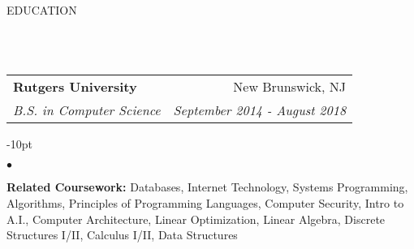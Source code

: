 \documentclass[12pt]{article}
\makeatletter
\newcommand{\header}[1]{
	\vspace*{12pt} %
	{\hspace*{-14pt}\vspace*{6pt} #1}
	\vspace*{-6pt} 
	\lineunder
}
\newcommand{\lineunder}{
	\vspace*{-8pt} \\ 
	\hspace*{-18pt} 
	\hrulefill \\
}
\newcommand{\subheading}[4]{
 	\vspace{5pt}
    	\begin{tabular*}{1.01\textwidth}
    		{l@{\extracolsep{\fill}}r}
      		\hspace{-16pt}\textbf{#1} & #2 \\
      		\hspace{-16pt}\textit{\small#3} & \textit{\small #4} \\
    	\end{tabular*}
    \vspace{-4pt}
}
\newenvironment{achievements}{
\begin{adjustwidth}{-10pt}{}
  \begin{list}{$\bullet$}{
  	\topsep 0pt \itemsep -4pt}}
  	{\vspace*{2pt}\end{list}
\end{adjustwidth}
}
\makeatother
\begin{document}
\vspace{-8pt}
\header{EDUCATION}

\subheading
	{Rutgers University}{New Brunswick, NJ}
	{B.S. in Computer Science}{September 2014 - August 2018}
	\begin{achievements}	
	\item{\bf Related Coursework:} Databases, Internet Technology, Systems Programming, Algorithms, Principles of Programming Languages, Computer Security, Intro to A.I., Computer Architecture, Linear Optimization,   Linear Algebra, Discrete Structures I/II, Calculus I/II, Data Structures
	\end{achievements}



	
\end{document}
